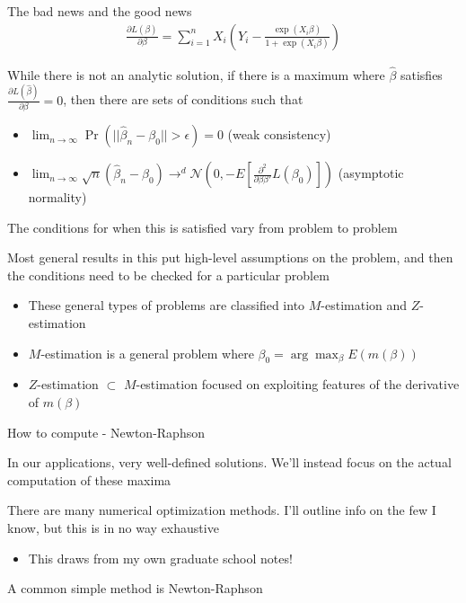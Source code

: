 \documentclass[notes,11pt, aspectratio=169]{beamer}
\newenvironment{wideitemize}{\itemize\addtolength{\itemsep}{10pt}}{\enditemize}
\begin{document}
  \begin{frame}{The bad news and the good news}
    \begin{align*}
      \frac{\partial L(\beta)}{\partial \beta} =  \sum_{i=1}^{n} X_{i}(Y_{i} - \frac{\exp(X_{i}\beta)}{1+\exp(X_{i}\beta)})
    \end{align*}
    \begin{wideitemize}
    \item While there is not an analytic solution, if there is a
      maximum where $\hat{\beta}$ satisfies
      $\frac{\partial L(\hat{\beta})}{\partial \beta} = 0$, then there
      are sets of conditions such that
      \begin{itemize}
      \item $\lim_{n\to\infty}\Pr(||\hat{\beta}_{n} - \beta_{0}|| > \epsilon) = 0$ (weak consistency)
      \item $\lim_{n\to\infty} \sqrt{n} (\hat{\beta}_{n} - \beta_{0}) \rightarrow^{d} \mathcal{N}\left(0, -E\left[\frac{\partial^{2}}{\partial\beta \beta'}L(\beta_{0})\right]\right)$ (asymptotic normality)
      \end{itemize}
    \item The conditions for when this is satisfied vary from problem
      to problem
    \item Most general results in this put high-level assumptions on
      the problem, and then the conditions need to be checked for a particular problem
      \begin{itemize}
      \item These general types of problems are classified into $M$-estimation
        and $Z$-estimation
      \item $M$-estimation is a general problem where $\beta_{0} = \arg\max_{\beta} E(m(\beta))$
      \item $Z$-estimation $\subset$ $M$-estimation focused on
        exploiting features of the derivative of $m(\beta)$
      \end{itemize}
    \end{wideitemize}
  \end{frame}


  \begin{frame}{How to compute - Newton-Raphson}
    \begin{wideitemize}
    \item In our applications, very well-defined solutions. We'll
      instead focus on the actual computation of these maxima
    \item There are many numerical optimization methods. I'll outline
      info on the few I know, but this is in no way exhaustive
      \begin{itemize}
      \item This draws from my own graduate school notes!
      \end{itemize}
    \item A common simple method is Newton-Raphson

    \end{wideitemize}
  \end{frame}
\end{document}
